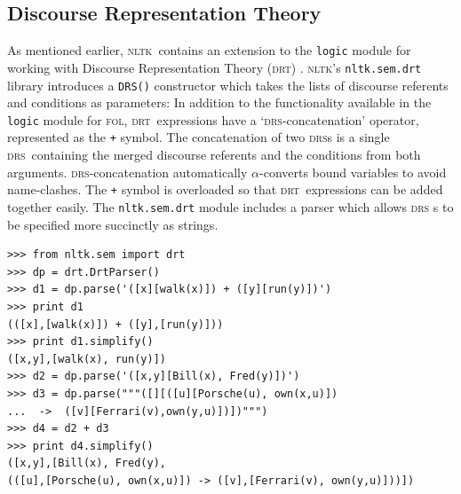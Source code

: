 \documentclass[11pt, a4paper]{article}
\newcommand{\DRS}{\textsc{drs}}
\newcommand{\DRT}{\textsc{drt}}
\newcommand{\FOL}{\textsc{fol}}
\newcommand{\NLTK}{\textsc{nltk}}
\newcommand{\dhgcode}[1]{{\tt #1}}
\begin{document}
\subsection{Discourse Representation Theory}
As mentioned earlier, \NLTK\ contains an extension to the
\dhgcode{logic} module for working with Discourse Representation
Theory (\DRT) \citep{KampReyle}.  \NLTK's \dhgcode{nltk.sem.drt}
library introduces a \texttt{DRS()} constructor which takes the lists
of discourse referents and conditions as parameters:
\enumsentence{\label{drt3} \dhgcode{DRS([j, d],[(John = j), dog(d),
    sees(j, d)])}} 
In addition to the functionality available in the
\texttt{logic} module for \FOL, \DRT\ expressions have a
`\DRS-concatenation' operator, represented as the \texttt{+} symbol.
The concatenation of two \DRS s is a single \DRS\ containing the
merged discourse referents and the conditions from both arguments.
\DRS-concatenation automatically $\alpha$-converts bound variables to
avoid name-clashes.  The \texttt{+} symbol is overloaded so that \DRT\
expressions can be added together easily. 
The \dhgcode{nltk.sem.drt} module includes a parser which allows \DRS
s to be specified more succinctly as strings.
\begin{Verbatim}
>>> from nltk.sem import drt
>>> dp = drt.DrtParser()
>>> d1 = dp.parse('([x][walk(x)]) + ([y][run(y)])')
>>> print d1
(([x],[walk(x)]) + ([y],[run(y)]))
>>> print d1.simplify()
([x,y],[walk(x), run(y)])
>>> d2 = dp.parse('([x,y][Bill(x), Fred(y)])')
>>> d3 = dp.parse("""([][([u][Porsche(u), own(x,u)])
...  ->  ([v][Ferrari(v),own(y,u)])])""")
>>> d4 = d2 + d3
>>> print d4.simplify()
([x,y],[Bill(x), Fred(y),
(([u],[Porsche(u), own(x,u)]) -> ([v],[Ferrari(v), own(y,u)]))])
\end{Verbatim}
\end{document}
